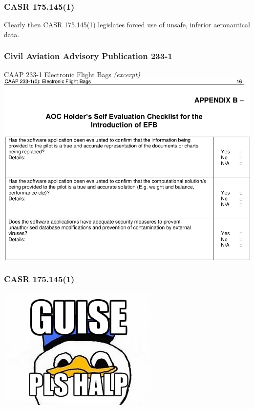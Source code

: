 \begin{frame}
\frametitle{CASR 175.145(1)}
\begin{block}{Clearly then}
CASR 175.145(1) legislates forced use of unsafe, inferior aeronautical data.
\end{block}
\end{frame}

\begin{frame}
\frametitle{Civil Aviation Advisory Publication 233-1}
\begin{block}{CAAP 233-1 Electronic Flight Bags \emph{(excerpt)}}
\includegraphics[height=0.6\textheight,natwidth=971,natheight=714]{image/caap-233.png}
\end{block}
\end{frame}

\begin{frame}
\frametitle{CASR 175.145(1)}
\begin{center}
\includegraphics[height=0.5\textheight,natwidth=306,natheight=230]{image/pls-halp.png}
\end{center}
\end{frame}

